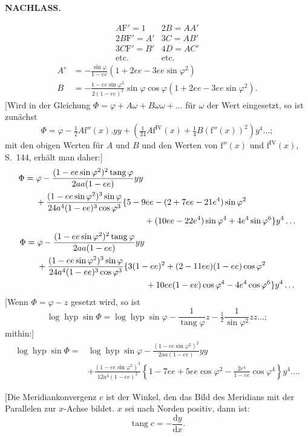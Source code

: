 \par\clearpage
{}\hfill{\small\textbf{NACHLASS.}}\hfill\null\par\medskip
{}
\[
\begin{array}{cc}
A\mathrm F'=1&2B=AA'\\2B\mathrm F'=A'&3C=AB'\\3C\mathrm F'=B'&4D=AC'\\\text{etc.}&\text{etc.}
\end{array}
\]
\[
\begin{aligned}
A'&=-\frac{\sin\varphi}{1-ee}(1+2ee-3ee\sin\varphi^2)\\
B&=-\frac{1-ee\sin\varphi^2}{2(1-ee)^2}\sin\varphi\cos\varphi(1+2ee-3ee\sin\varphi^2).
\end{aligned}
\]
[Wird in der Gleichung \(\Phi=\varphi+A\omega+B\omega\omega+\ldots\) für \(\omega\) der Wert eingesetzt, so ist zunächst
\[\Phi=\varphi-\tfrac12A\mathrm f''(x).yy+\left(\tfrac1{24}A\mathrm f^{\mathrm{IV}}(x)+\tfrac14B(\mathrm f''(x))^2\right)y^4\ldots;\]
\noindent mit den obigen Werten für \(A\) und \(B\) und den Werten von \(\mathrm f''(x)\) und \(\mathrm f^{\mathrm{IV}}(x)\), S.~144, erhält man daher:]
\[
\begin{aligned}
\Phi={}&\varphi-\frac{(1-ee\sin\varphi^2)^2\operatorname{tang}\varphi}{2aa(1-ee)}yy\\
&+\frac{(1-ee\sin\varphi^2)^3\sin\varphi}{24a^4(1-ee)^3\cos\varphi^3}\{5-9ee-(2+7ee-21e^4)\sin\varphi^2\\
&\hspace{45mm}+(10ee-22e^4)\sin\varphi^4+4e^4\sin\varphi^6\}y^4\ldots
\end{aligned}
\]
\noindent[oder]
\[
\begin{aligned}
\Phi={}&\varphi-\frac{(1-ee\sin\varphi^2)^2\operatorname{tang}\varphi}{2aa(1-ee)}yy\\
&+\frac{(1-ee\sin\varphi^2)^3\sin\varphi}{24a^4(1-ee)^3\cos\varphi^3}\{3(1-ee)^2+(2-11ee)(1-ee)\cos\varphi^2\\
&\hspace{45mm}+10ee(1-ee)\cos\varphi^4-4e^4\cos\varphi^6\}y^4\ldots
\end{aligned}
\]
[Wenn \(\Phi=\varphi-z\) gesetzt wird, so ist
\[\log\operatorname{hyp}\sin\Phi=\log\operatorname{hyp}\sin\varphi-\frac1{\operatorname{tang}\varphi}z-\tfrac12\frac1{\sin\varphi^2}zz\ldots;\]
\noindent mithin:]
\[
\begin{aligned}
\log\operatorname{hyp}\sin\Phi={}&\log\operatorname{hyp}\sin\varphi-\frac{(1-ee\sin\varphi^2)^2}{2aa(1-ee)}yy\\
&+\frac{(1-ee\sin\varphi^2)^3}{12a^4(1-ee)^2}\left\{1-7ee+5ee\cos\varphi^2-\frac{2e^4}{1-ee}\cos\varphi^4\right\}y^4\ldots.
\end{aligned}
\]
{\centering [2.]\par
[Berechnung der Meridiankonvergenz aus den ebenen rechtwinkligen Koordinaten.]\par}
[Die Meridiankonvergenz \(c\) ist der Winkel, den das Bild des Meridians mit der Parallelen zur \(x\)-Achse bildet. \(x\) sei nach Norden positiv, dann ist:
\[\operatorname{tang}c=-\frac{\mathrm dy}{\mathrm dx}.\]

